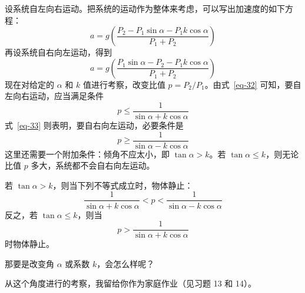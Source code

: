 \begin{dialogue}
设系统自左向右运动。把系统的运动作为整体来考虑，可以写出加速度的如下方程：
\begin{equation}%
a = g \left( \frac{P_{2} - P_{1} \sin \alpha - P_{1} k \cos \alpha}{P_{1}+P_{2}}\right)
\label{eq-32}
\end{equation}
再设系统自右向左运动，得到
\begin{equation}%
a = g \left( \frac{P_{1} \sin \alpha - P_{2} - P_{1} k \cos \alpha}{P_{1}+P_{2}}\right)
\label{eq-33}
\end{equation}
现在对给定的 $\alpha$ 和 $k$ 值进行考察，改变比值 $p=P_{2}/P_{1}$。由式~\eqref{eq-32} 可知，要自左向右运动，应当满足条件
\begin{equation*}%
p \leqslant \frac{1}{\sin \alpha + k \cos \alpha}
\end{equation*}
式~\eqref{eq-33} 则表明，要自右向左运动，必要条件是
\begin{equation*}%
p \geqslant \frac{1}{\sin \alpha - k \cos \alpha}
\end{equation*}
这里还需要一个附加条件：倾角不应太小，即 $\tan \alpha >k$。若 $\tan \alpha \leqslant k$，则无论比值 $p$ 多大，系统都不会自右向左运动。

若 $\tan \alpha >k$，则当下列不等式成立时，物体静止：
\begin{equation*}%
 \frac{1}{\sin \alpha + k \cos \alpha} < p < \frac{1}{\sin \alpha - k \cos \alpha}
\end{equation*}
反之，若 $\tan \alpha \leqslant k$，则当
\begin{equation*}%
p > \frac{1}{\sin \alpha + k \cos \alpha}
\end{equation*}
时物体静止。

\std 那要是改变角 $\alpha$ 或系数 $k$，会怎么样呢？

\tchr 从这个角度进行的考察，我留给你作为家庭作业（见习题 13 和 14）。

\end{dialogue}
